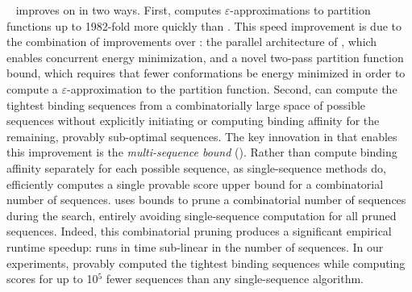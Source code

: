 \bbks~\cite{BBK*} improves on \ks in two ways. First, \bbks computes $\varepsilon$-approximations to partition functions up to 1982-fold more quickly than \ks. This speed improvement is due to the combination of improvements over \ks: the parallel architecture of \bbks, which enables concurrent energy minimization, and a novel two-pass partition function bound, which requires that fewer conformations be energy minimized in order to compute a $\varepsilon$-approximation to the partition function. Second, \bbks can compute the tightest binding sequences from a combinatorially large space of possible sequences without explicitly initiating or computing binding affinity for the remaining, provably sub-optimal sequences. The key innovation in \bbks that enables this improvement is the \emph{multi-sequence bound} (\msbound). Rather than compute binding affinity separately for each possible sequence, as single-sequence methods do, \bbks efficiently computes a single provable \ks score upper bound for a combinatorial number of sequences. \bbks uses \msbound bounds to prune a combinatorial number of sequences during the search, entirely avoiding single-sequence computation for all pruned sequences. Indeed, this combinatorial pruning produces a significant empirical runtime speedup: \bbks runs in time sub-linear in the number of sequences. In our experiments, \bbks provably computed the tightest binding sequences while computing \ks scores for up to 10$^5$ fewer sequences than any single-sequence algorithm.